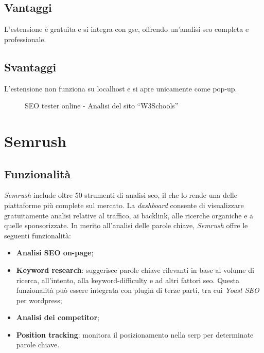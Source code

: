 \subsection{Vantaggi}
\par L'estensione è gratuita e si integra con \gls{gsc}, offrendo un'analisi \gls{seo} completa e professionale.

\subsection{Svantaggi}
\par L'estensione non funziona su \gls{localhost} e si apre unicamente come pop-up.

\begin{figure}[H]
    \centering 
    \caption{SEO tester online - Analisi del sito “W3Schools”}
\end{figure}

\section{Semrush}

\subsection{Funzionalità}
\par \textit{Semrush} include oltre 50 strumenti di analisi \gls{seo}, il che lo rende una delle piattaforme più complete sul mercato. La \textit{dashboard} consente di visualizzare gratuitamente analisi relative al traffico, ai \gls{backlink}, alle ricerche \gls{organiche} e a quelle \gls{sponsorizzate}. In merito all’analisi delle parole chiave, \textit{Semrush} offre le seguenti funzionalità:
\begin{itemize}
    \item \textbf{Analisi SEO on-page};
    \item \textbf{Keyword research}: suggerisce parole chiave rilevanti in base al volume di ricerca, all'intento, alla \gls{keyword-difficulty} e ad altri fattori \gls{seo}. Questa funzionalità può essere integrata con plugin di terze parti, tra cui \textit{Yoast SEO} per \gls{wordpress};
    \item \textbf{Analisi dei competitor};
    \item \textbf{Position tracking}: monitora il posizionamento nella \gls{serp} per determinate parole chiave.
\end{itemize}

